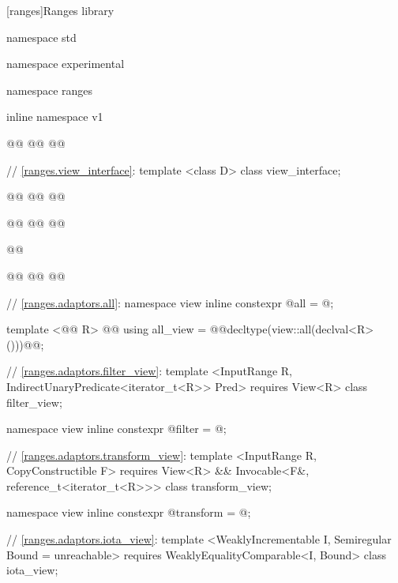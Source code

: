 
\setcounter{chapter}{9}
[ranges]{Ranges library}


\begin{codeblock}
namespace std { namespace experimental { namespace ranges { inline namespace v1 {
  @\added{// \ref{ranges.viewable}:}@
  @@
  @@

  // \ref{ranges.view_interface}:
  template <class D>
  class view_interface;

  @@
  @@
  @@

  @@
  @@
  @@

  @@

  @\added{// \ref{ranges.subrange}:}@
  @@
  @@

  // \ref{ranges.adaptors.all}:
  namespace view { inline constexpr @\unspec@ all = @\unspec@; }

  template <@@ R>
    @@
  using all_view = @@decltype(view::all(declval<R>()))@\removed{>}@;

  // \ref{ranges.adaptors.filter_view}:
  template <InputRange R, IndirectUnaryPredicate<iterator_t<R>> Pred>
    requires View<R>
  class filter_view;

  namespace view { inline constexpr @\unspec@ filter = @\unspec@; }

  // \ref{ranges.adaptors.transform_view}:
  template <InputRange R, CopyConstructible F>
    requires View<R> && Invocable<F&, reference_t<iterator_t<R>>>
  class transform_view;

  namespace view { inline constexpr @\unspec@ transform = @\unspec@; }

  // \ref{ranges.adaptors.iota_view}:
  template <WeaklyIncrementable I, Semiregular Bound = unreachable>
    requires WeaklyEqualityComparable<I, Bound>
  class iota_view;

}}}}
\end{codeblock}

